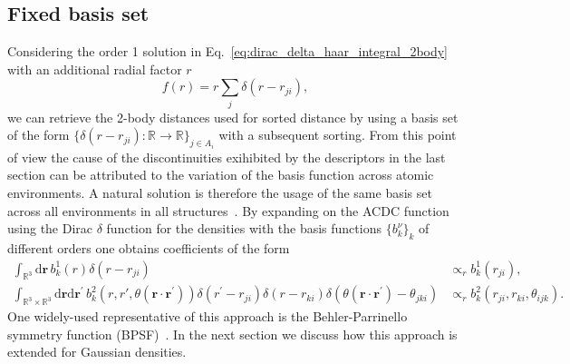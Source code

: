 \subsection{Fixed basis set}
Considering the order 1 solution in Eq.~\eqref{eq:dirac_delta_haar_integral_2body} with an additional radial factor $r$
\begin{equation}
  f(r) = r \sum_j \delta(r-r_{ji}),  %
\end{equation}
we can retrieve the 2-body distances used for sorted distance by using a basis set of the form $\{\delta(r-r_{ji}):\mathbb{R}\rightarrow\mathbb{R}\}_{j\in A_i}$ with a subsequent sorting.
From this point of view the cause of the discontinuities exihibited by the descriptors in the last section can be attributed to the variation of the basis function across atomic environments.
A natural solution is therefore the usage of the same basis set across all environments in all structures~\cite{behler2011atom,bartok2013representing,drautz2019atomic}.
By expanding on the ACDC function using the Dirac $\delta$ function for the densities with the basis functions $\{b^\nu_k\}_k$ of different orders one obtains coefficients of the form
\begin{subequations}
\label{eq:dirac_delta_expansion_coeffs}
\begin{align}
    \label{eq:dirac_delta_expansion_coeffs_2body}
    \int_{\mathbb{R}^3}\mathrm{d}\mathbf{r}\, b^1_k(r)\delta(r-r_{ji}) &\propto_r b^1_k(r_{ji}),\\
    \label{eq:dirac_delta_expansion_coeffs_3body}
    \int_{\mathbb{R}^3\times\mathbb{R}^3}\mathrm{d}\mathbf{r}\mathrm{d}\mathbf{r}^\prime\, b^2_k(r,r\prime,\theta(\mathbf{r}\cdot\mathbf{r}^\prime))\delta(r^\prime-r_{ji})\delta(r-r_{ki})
    \delta(\theta(\mathbf{r}\cdot\mathbf{r}^\prime) - \theta_{jki}) &\propto_r b^2_k(r_{ji},r_{ki},\theta_{ijk}).
\end{align}
\end{subequations}
One widely-used representative of this approach is the Behler-Parrinello symmetry function (BPSF)~\cite{behl11jcp}.
In the next section we discuss how this approach is extended for Gaussian densities. 

